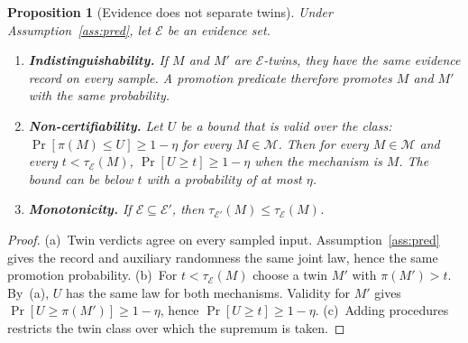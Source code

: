 \documentclass[11pt]{article}
\newtheorem{proposition}{Proposition}
\theoremstyle{definition}
\theoremstyle{remark}
\newcommand{\Mclass}{\mathcal{M}}
\begin{document}
\begin{proposition}[Evidence does not separate twins]\label{prop:twin}
Under Assumption~\ref{ass:pred}, let $\mathcal{E}$ be an evidence set.
\begin{enumerate}[label=\textup{(\alph*)},leftmargin=2em,itemsep=3pt]
\item \textbf{Indistinguishability.} If $M$ and $M'$ are $\mathcal{E}$-twins, they have the same
evidence record on every sample. A promotion predicate therefore promotes $M$ and $M'$ with the same
probability.
\item \textbf{Non-certifiability.} Let $U$ be a bound that is valid over the class:
$\Pr[\pi(M)\le U]\ge 1-\eta$ for every $M\in\Mclass$. Then for every $M\in\Mclass$ and every
$t<\tau_{\mathcal{E}}(M)$, $\Pr[U\ge t]\ge 1-\eta$ when the mechanism is $M$. The bound can be below
$t$ with a probability of at most $\eta$.
\item \textbf{Monotonicity.} If $\mathcal{E}\subseteq\mathcal{E}'$, then
$\tau_{\mathcal{E}'}(M)\le\tau_{\mathcal{E}}(M)$.
\end{enumerate}
\end{proposition}
\begin{proof}
(a)~Twin verdicts agree on every sampled input. Assumption~\ref{ass:pred} gives the record and
auxiliary randomness the same joint law, hence the same promotion probability.
(b)~For $t<\tau_{\mathcal{E}}(M)$ choose a twin $M'$ with $\pi(M')>t$.
By~(a), $U$ has the same law for both mechanisms. Validity for $M'$ gives
$\Pr[U\ge\pi(M')]\ge1-\eta$, hence $\Pr[U\ge t]\ge1-\eta$.
(c)~Adding procedures restricts the twin class over which the supremum is taken.
\end{proof}
\end{document}
